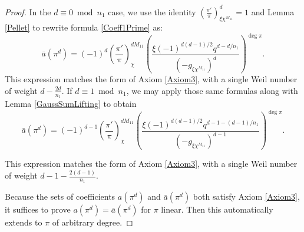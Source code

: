 \documentclass[11pt,letterpaper]{article}
\theoremstyle{definition}
\theoremstyle{remark}
\numberwithin{equation}{section}
\theoremstyle{dotless}
\newcommand{\res}[2]{\left(\frac{#1}{#2}\right)}
\begin{document}
\begin{proof}
In the $d \equiv 0 \bmod n_1$ case, we use the identity $\res{\pi'}{\pi}_{ \xi \chi^{M_{11}}}^d=1$ and Lemma \ref{Pellet} to rewrite formula \eqref{Coeff1Prime} as:
\begin{equation*}
    \bar{a}(\pi^d) =(-1)^d \res{\pi'}{\pi}_{\chi}^{dM_{11}} \left(\frac{\xi(-1)^{d(d-1)/2} q^{d-d/n_1}}{(-g_{\xi \chi^{M_{11}}})^{d}}\right)^{\deg \pi} .
\end{equation*}
This expression matches the form of Axiom \ref{Axiom3}, with a single Weil number of weight $d-\frac{2d}{n_1}$. 
If $d \equiv 1 \bmod n_1$, we may apply those same formulas along with Lemma \ref{GaussSumLifting} to obtain
\begin{equation*}
    \bar{a}(\pi^d) = (-1)^{d-1} \res{\pi'}{\pi}_{\chi}^{dM_{11}} \left( \frac{\xi(-1)^{d(d-1)/2}q^{d-1-(d-1)/n_1}}{(-g_{\xi \chi^{M_{11}}})^{d-1}} \right)^{\deg \pi} .
\end{equation*}

This expression matches the form of Axiom \ref{Axiom3}, with a single Weil number of weight $d-1-\frac{2(d-1)}{n_1}$.

Because the sets of coefficients $a(\pi^d)$ and $\bar{a}(\pi^d)$ both satisfy Axiom \ref{Axiom3}, it suffices to prove $a(\pi^d)=\bar{a}(\pi^d)$ for $\pi$ linear. Then this automatically extends to $\pi$ of arbitrary degree.


\end{proof}
\end{document}
